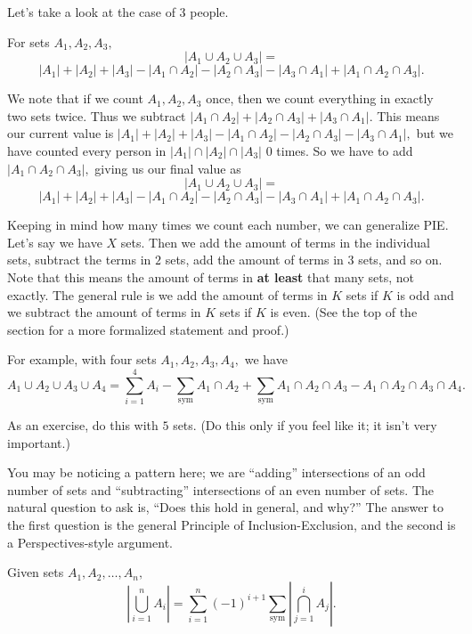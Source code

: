 Let's take a look at the case of $3$ people.

\begin{theo}
For sets $A_1,A_2,A_3,$
\[|A_1\cup A_2\cup A_3|=\]
\[|A_1|+|A_2|+|A_3|-|A_1\cap A_2|-|A_2\cap A_3|- |A_3\cap A_1|+|A_1\cap A_2\cap A_3|.\]
\end{theo}

\begin{pro}
We note that if we count $A_1,A_2,A_3$ once, then we count everything in exactly two sets twice. Thus we subtract $|A_1\cap A_2|+|A_2\cap A_3|+|A_3\cap A_1|.$ This means our current value is $|A_1|+|A_2|+|A_3|-|A_1\cap A_2|-|A_2\cap A_3|- |A_3\cap A_1|,$ but we have counted every person in $|A_1|\cap |A_2|\cap |A_3|$ $0$ times. So we have to add $|A_1\cap A_2\cap A_3|,$ giving us our final value as
$$|A_1\cup A_2\cup A_3|=$$
$$|A_1|+|A_2|+|A_3|-|A_1\cap A_2|-|A_2\cap A_3|- |A_3\cap A_1|+|A_1\cap A_2\cap A_3|.$$
\end{pro}

Keeping in mind how many times we count each number, we can generalize PIE. Let's say we have $X$ sets. Then we add the amount of terms in the individual sets, subtract the terms in $2$ sets, add the amount of terms in $3$ sets, and so on. Note that this means the amount of terms in \textbf{at least} that many sets, not exactly. The general rule is we add the amount of terms in $K$ sets if $K$ is odd and we subtract the amount of terms in $K$ sets if $K$ is even. (See the top of the section for a more formalized statement and proof.)

For example, with four sets $A_1,A_2,A_3,A_4,$ we have $$A_1\cup A_2\cup A_3\cup A_4=\sum\limits_{i=1}^{4}A_i-\sum\limits_{\text{sym}}A_1\cap A_2+\sum\limits_{\text{sym}}A_1\cap A_2\cap A_3-A_1\cap A_2\cap A_3 \cap A_4.$$

As an exercise, do this with $5$ sets. (Do this only if you feel like it; it isn't very important.)

You may be noticing a pattern here; we are ``adding'' intersections of an odd number of sets and ``subtracting'' intersections of an even number of sets. The natural question to ask is, ``Does this hold in general, and why?'' The answer to the first question is the general Principle of Inclusion-Exclusion, and the second is a Perspectives-style argument.
\begin{theo}
Given sets $A_1,A_2,\dots,A_n,$
$$|\bigcup_{i=1}^n A_i|=\sum\limits_{i=1}^{n} (-1)^{i+1}\sum\limits_{\text{sym}}|\bigcap_{j=1}^{i} A_j|.$$
\end{theo}

